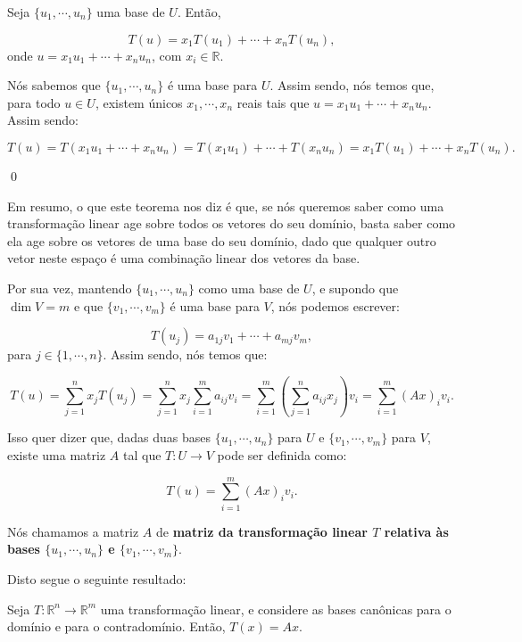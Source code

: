 \begin{Theorem}
	Seja $\{u_1, \cdots, u_n\}$ uma base de $U$. Então,
	
	$$
	T(u) = x_1T(u_1) + \cdots + x_nT(u_n),
	$$
	onde $u = x_1u_1 + \cdots + x_nu_n$, com $x_i\in\mathbb{R}$.
\end{Theorem}

\begin{Proof}
	Nós sabemos que $\{u_1, \cdots, u_n\}$ é uma base para $U$. Assim sendo, nós temos que, para todo $u\in U$, existem únicos $x_1, \cdots, x_n$ reais tais que $u = x_1u_1 + \cdots + x_nu_n$. Assim sendo:
	
	$$
	T(u) = T(x_1u_1 + \cdots + x_nu_n) = T(x_1u_1) + \cdots + T(x_nu_n) = x_1T(u_1) + \cdots + x_nT(u_n).
	$$
	
	\qed
\end{Proof}

Em resumo, o que este teorema nos diz é que, se nós queremos saber como uma transformação linear age sobre todos os vetores do seu domínio, basta saber como ela age sobre os vetores de uma base do seu domínio, dado que qualquer outro vetor neste espaço é uma combinação linear dos vetores da base.

Por sua vez, mantendo $\{u_1, \cdots, u_n\}$ como uma base de $U$, e supondo que $\dim V = m$ e que $\{v_1, \cdots, v_m\}$ é uma base para $V$, nós podemos escrever:

$$
T(u_j) = a_{1j}v_1 + \cdots + a_{mj}v_m,
$$
para $j\in\{1, \cdots, n\}$. Assim sendo, nós temos que:

$$
T(u) = \sum\limits_{j = 1}^{n} x_jT(u_j) = \sum\limits_{j = 1}^n x_j\sum\limits_{i = 1}^{m} a_{ij}v_i = \sum\limits_{i = 1}^{m}\left(\sum\limits_{j = 1}^{n} a_{ij}x_j\right)v_i = \sum\limits_{i = 1}^{m}(Ax)_iv_i.
$$

Isso quer dizer que, dadas duas bases $\{u_1, \cdots, u_n\}$ para $U$ e $\{v_1, \cdots, v_m\}$ para $V$, existe uma matriz $A$ tal que $T:U\to V$ pode ser definida como:

$$
T(u) = \sum\limits_{i = 1}^{m} (Ax)_iv_i.
$$

Nós chamamos a matriz $A$ de \textbf{matriz da transformação linear $T$ relativa às bases $\{u_1, \cdots, u_n\}$ e $\{v_1, \cdots, v_m\}$}.

Disto segue o seguinte resultado:

\begin{Proposition}
	Seja $T:\mathbb{R}^n\to\mathbb{R}^m$ uma transformação linear, e considere as bases canônicas para o domínio e para o contradomínio. Então, $T(x) = Ax$.
\end{Proposition}

